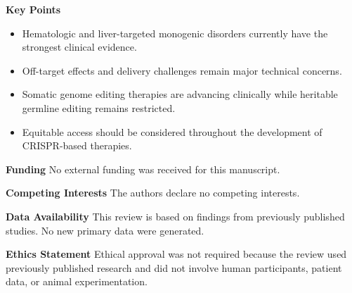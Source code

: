 \documentclass[11pt,a4paper]{article}
\begin{document}
\textbf{Key Points}

\begin{itemize}
\item Hematologic and liver-targeted monogenic disorders currently have the strongest clinical evidence.
\item Off-target effects and delivery challenges remain major technical concerns.
\item Somatic genome editing therapies are advancing clinically while heritable germline editing remains restricted.
\item Equitable access should be considered throughout the development of CRISPR-based therapies.
\end{itemize}

\textbf{Funding} No external funding was received for this manuscript.

\textbf{Competing Interests} The authors declare no competing interests.

\textbf{Data Availability} This review is based on findings from previously published studies. No new primary data were generated.

\textbf{Ethics Statement} Ethical approval was not required because the review used previously published research and did not involve human participants, patient data, or animal experimentation.
\end{document}
